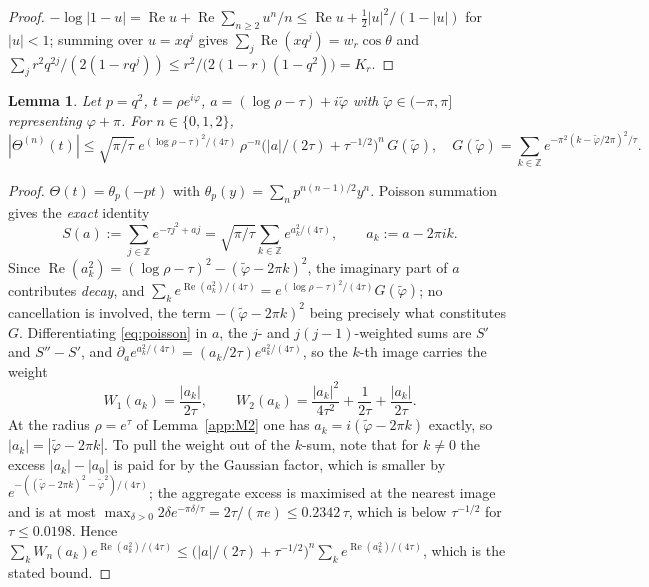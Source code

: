 \documentclass[11pt]{article}
\theoremstyle{plain}
\newtheorem{lemma}[theorem]{Lemma}
\theoremstyle{definition}
\theoremstyle{remark}
\newcommand{\Z}{\mathbb{Z}}
\begin{document}
\begin{proof}
$-\log|1-u|=\operatorname{Re}u+\operatorname{Re}\sum_{n\ge2}u^n/n
\le\operatorname{Re}u+\tfrac12|u|^2/(1-|u|)$ for $|u|<1$; summing over $u=xq^j$ gives
$\sum_j\operatorname{Re}(xq^j)=w_r\cos\theta$ and
$\sum_j r^2q^{2j}/(2(1-rq^j))\le r^2/\bigl(2(1-r)(1-q^2)\bigr)=K_r$.
\end{proof}

\begin{lemma}\label{app:theta}
Let $p=q^2$, $t=\rho e^{i\varphi}$, $a=(\log\rho-\tau)+i\tilde\varphi$ with
$\tilde\varphi\in(-\pi,\pi]$ representing $\varphi+\pi$. For $n\in\{0,1,2\}$,
\[
 |\Theta^{(n)}(t)|\le\sqrt{\pi/\tau}\;e^{(\log\rho-\tau)^2/(4\tau)}\,\rho^{-n}
 \bigl(|a|/(2\tau)+\tau^{-1/2}\bigr)^n\,G(\tilde\varphi),\quad
 G(\tilde\varphi)=\sum_{k\in\Z}e^{-\pi^2(k-\tilde\varphi/2\pi)^2/\tau}.
\]
\end{lemma}

\begin{proof}
$\Theta(t)=\theta_p(-pt)$ with $\theta_p(y)=\sum_np^{n(n-1)/2}y^n$. Poisson summation gives the
\emph{exact} identity
\begin{equation}\label{eq:poisson}
 S(a):=\sum_{j\in\Z}e^{-\tau j^2+aj}=\sqrt{\pi/\tau}\sum_{k\in\Z}e^{a_k^2/(4\tau)},
 \qquad a_k:=a-2\pi ik .
\end{equation}
Since $\operatorname{Re}(a_k^2)=(\log\rho-\tau)^2-(\tilde\varphi-2\pi k)^2$, the imaginary part of $a$ contributes
\emph{decay}, and $\sum_k e^{\operatorname{Re}(a_k^2)/(4\tau)}=e^{(\log\rho-\tau)^2/(4\tau)}G(\tilde\varphi)$; no
cancellation is involved, the term $-(\tilde\varphi-2\pi k)^2$ being precisely what constitutes $G$.
Differentiating \eqref{eq:poisson} in $a$, the $j$- and $j(j-1)$-weighted sums are $S'$ and
$S''-S'$, and $\partial_ae^{a_k^2/(4\tau)}=(a_k/2\tau)e^{a_k^2/(4\tau)}$, so the $k$-th image carries
the weight
\[
 W_1(a_k)=\frac{|a_k|}{2\tau},\qquad
 W_2(a_k)=\frac{|a_k|^2}{4\tau^2}+\frac1{2\tau}+\frac{|a_k|}{2\tau}.
\]
At the radius $\rho=e^\tau$ of Lemma~\ref{app:M2} one has $a_k=i(\tilde\varphi-2\pi k)$ exactly, so
$|a_k|=|\tilde\varphi-2\pi k|$. To pull the weight out of the $k$-sum, note that for $k\ne0$ the
excess $|a_k|-|a_0|$ is paid for by the Gaussian factor, which is smaller by
$e^{-((\tilde\varphi-2\pi k)^2-\tilde\varphi^2)/(4\tau)}$; the aggregate excess is maximised at the
nearest image and is at most $\max_{\delta>0}2\delta e^{-\pi\delta/\tau}=2\tau/(\pi e)\le0.2342\,\tau$,
which is below $\tau^{-1/2}$ for $\tau\le0.0198$. Hence
$\sum_kW_n(a_k)e^{\operatorname{Re}(a_k^2)/(4\tau)}\le\bigl(|a|/(2\tau)+\tau^{-1/2}\bigr)^n
\sum_ke^{\operatorname{Re}(a_k^2)/(4\tau)}$, which is the stated bound.
\end{proof}
\end{document}
